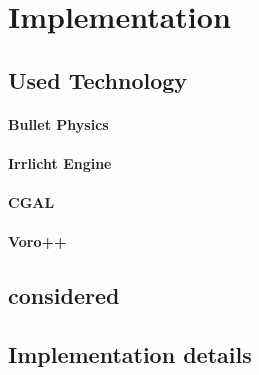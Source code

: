 \chapter{Implementation}

\section{Used Technology}
\subsubsection{Bullet Physics}
\subsubsection{Irrlicht Engine}
\subsubsection{CGAL}
\subsubsection{Voro++}

\section{considered}

\section{Implementation details}
